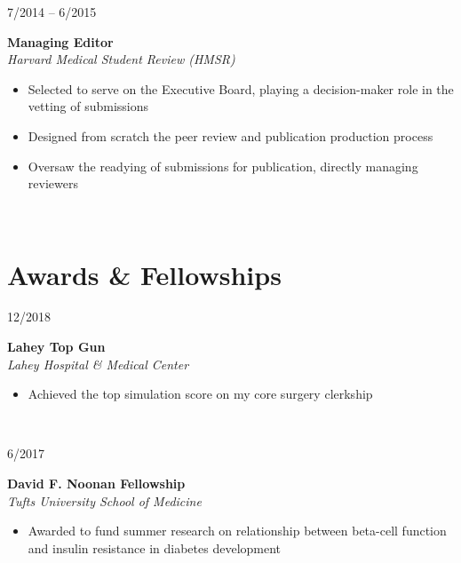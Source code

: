 \documentclass{article}
\newcommand\colleft{.20}
\newcommand\colright{.75}
\newcommand{\entryfour}[4]
	{
		\begin{minipage}[t]{\colleft\textwidth}
		\hfill \textsc{#1}
		\end{minipage}
		\hfill\vline\hfill
		\begin{minipage}[t]{\colright\textwidth}
		{\bf#2}\\
		\textit{#3}
		\footnotesize{#4}
		\end{minipage}\\
		\entryvspace
	}%
\newcommand{\entryvspace}{\vspace{0.5em}}
\begin{document}

	\entryfour{7/2014 -- 6/2015}{Managing Editor}{Harvard Medical Student Review (HMSR)}{%
	\begin{itemize}
		\item Selected to serve on the Executive Board, playing a decision-maker role in the vetting of submissions
		\item Designed from scratch the peer review and publication production process
		\item Oversaw the readying of submissions for publication, directly managing reviewers
	\end{itemize}
	}

	\section*{Awards \& Fellowships}
	\entryfour{12/2018}{Lahey Top Gun}{Lahey Hospital \& Medical Center}{%
		\begin{itemize}
			\item Achieved the top simulation score on my core surgery clerkship
			\end{itemize}
		}
	
	\entryfour{6/2017}{David F. Noonan Fellowship}{Tufts University School of Medicine}{%
		\begin{itemize}
			\item Awarded to fund summer research on relationship between beta-cell function and insulin
			resistance in diabetes development
			\end{itemize}
		}
	
\end{document}
